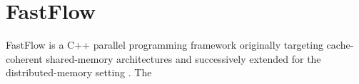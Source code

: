 \section{FastFlow}
FastFlow is a C++ parallel programming framework originally targeting cache-coherent shared-memory architectures \cite{fastflow} and successively extended for the distributed-memory setting \cite{fastflow}. The 